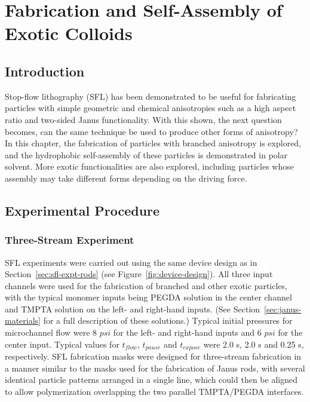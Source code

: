 \chapter{Fabrication and Self-Assembly of Exotic Colloids}
\label{ch:exotic}

\section{Introduction}

Stop-flow lithography (SFL) has been demonstrated to be useful for fabricating particles with 
simple geometric and chemical anisotropies such as a high aspect ratio and 
two-sided Janus functionality.
With this shown, the next question becomes, can the same technique be used to produce other forms of 
anisotropy?  In this chapter, the fabrication of particles with branched anisotropy is explored, and 
the hydrophobic self-assembly of these particles is demonstrated in polar solvent.  More exotic 
functionalities are also explored, including particles whose assembly may take different forms 
depending on the driving force.


\section{Experimental Procedure}
\label{sec:SFLx3}

\subsection{Three-Stream Experiment}


SFL experiments were carried out using the same device design as in Section~\ref{sec:sfl-expt-rods} 
(see Figure~\ref{fig:device-design}).  All three input channels were used for the fabrication of 
branched and other exotic particles, with the typical monomer inputs being PEGDA solution in
the center channel and TMPTA solution on the left- and right-hand inputs. (See 
Section~\ref{sec:janus-materials} for a full description of these solutions.) 
Typical initial pressures for microchannel
flow were 8 $psi$ for the left- and right-hand inputs and 6 $psi$ for
the center input. Typical values for $t_{flow}$, $t_{pause}$ and $t_{expose}$ were 2.0 s, 2.0 s and 0.25 s, 
respectively.  SFL fabrication masks were designed for three-stream fabrication in a manner similar to 
the masks used for the fabrication of Janus rods, with several identical particle patterns arranged
in a single line, which could then be aligned to allow polymerization overlapping the 
two parallel TMPTA/PEGDA interfaces.

